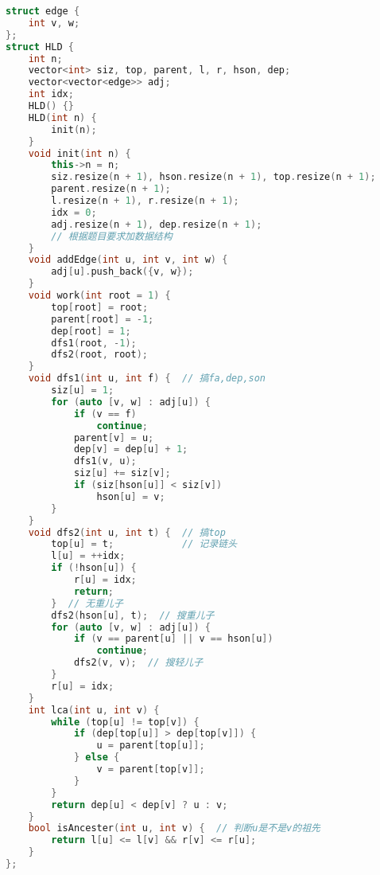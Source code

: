 \begin{lstlisting}[language=C++]
struct edge {
    int v, w;
};
struct HLD {
    int n;
    vector<int> siz, top, parent, l, r, hson, dep;
    vector<vector<edge>> adj;
    int idx;
    HLD() {}
    HLD(int n) {
        init(n);
    }
    void init(int n) {
        this->n = n;
        siz.resize(n + 1), hson.resize(n + 1), top.resize(n + 1);
        parent.resize(n + 1);
        l.resize(n + 1), r.resize(n + 1);
        idx = 0;
        adj.resize(n + 1), dep.resize(n + 1);
        // 根据题目要求加数据结构
    }
    void addEdge(int u, int v, int w) {
        adj[u].push_back({v, w});
    }
    void work(int root = 1) {
        top[root] = root;
        parent[root] = -1;
        dep[root] = 1;
        dfs1(root, -1);
        dfs2(root, root);
    }
    void dfs1(int u, int f) {  // 搞fa,dep,son
        siz[u] = 1;
        for (auto [v, w] : adj[u]) {
            if (v == f)
                continue;
            parent[v] = u;
            dep[v] = dep[u] + 1;
            dfs1(v, u);
            siz[u] += siz[v];
            if (siz[hson[u]] < siz[v])
                hson[u] = v;
        }
    }
    void dfs2(int u, int t) {  // 搞top
        top[u] = t;            // 记录链头
        l[u] = ++idx;
        if (!hson[u]) {
            r[u] = idx;
            return;
        }  // 无重儿子
        dfs2(hson[u], t);  // 搜重儿子
        for (auto [v, w] : adj[u]) {
            if (v == parent[u] || v == hson[u])
                continue;
            dfs2(v, v);  // 搜轻儿子
        }
        r[u] = idx;
    }
    int lca(int u, int v) {
        while (top[u] != top[v]) {
            if (dep[top[u]] > dep[top[v]]) {
                u = parent[top[u]];
            } else {
                v = parent[top[v]];
            }
        }
        return dep[u] < dep[v] ? u : v;
    }
    bool isAncester(int u, int v) {  // 判断u是不是v的祖先
        return l[u] <= l[v] && r[v] <= r[u];
    }
};
\end{lstlisting}
